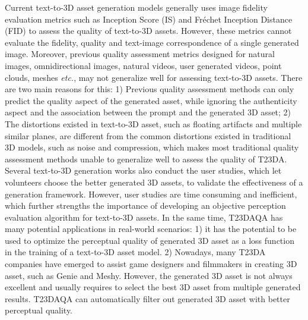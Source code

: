 Current text-to-3D asset generation models generally uses image fidelity evaluation metrics such as Inception Score (IS) \cite{gulrajani2017improved} and Fréchet Inception Distance (FID) \cite{heusel2017gans} to assess the quality of text-to-3D assets. However, these metrics cannot evaluate the fidelity, quality and text-image correspondence of a single generated image. Moreover, previous quality assessment metrics designed for natural images, omnidirectional images, natural videos, user generated videos, point clouds, meshes \textit{etc.}\cite{zhou2024blind,chen2024dynamic,sun2022a,wu2023dover}, may not generalize well for assessing text-to-3D assets. There are two main reasons for this: 1) Previous quality assessment methods can only predict the quality aspect of the generated asset, while ignoring the authenticity aspect and the association between the prompt and the generated 3D asset; 2) The distortions existed in text-to-3D asset, such as floating artifacts and multiple similar planes, are different from the common distortions existed in traditional 3D models, such as noise and compression, which makes most traditional quality assessment methods unable to generalize well to assess the quality of T23DA. Several text-to-3D generation works also conduct the user studies, which let volunteers choose the better generated 3D assets, to validate the effectiveness of a generation framework. However, user studies are time consuming and inefficient, which further strengths the importance of developing an objective perception evaluation algorithm for text-to-3D assets. In the same time, T23DAQA has many potential applications in real-world scenarios: 1) it has the potential to be used to optimize the perceptual quality of generated 3D asset as a loss function in the training of a text-to-3D asset model. 2) Nowadays, many T23DA companies have emerged to assist game designers and filmmakers in creating 3D asset, such as Genie \cite{genie} and Meshy\cite{meshy}. However, the generated 3D asset is not always excellent and usually requires to select the best 3D asset from multiple generated results. T23DAQA can automatically filter out generated 3D asset with better perceptual quality.

